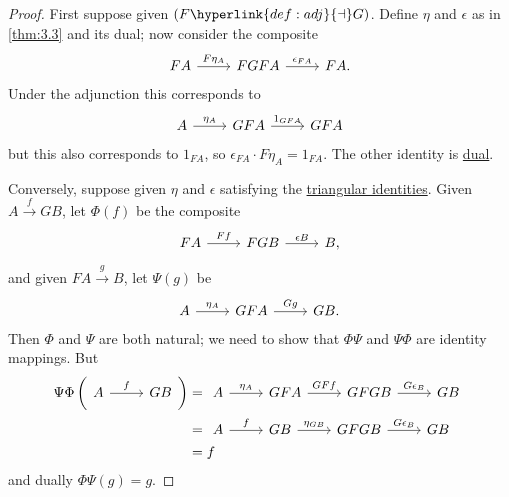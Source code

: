 \documentclass{article}
\begin{document}
\begin{proof}
  First suppose given $(F \hyperlink{def:adj}{\dashv} G)$.
  Define $\eta$ and $\epsilon$ as in \cref{thm:3.3} and its dual; now consider the composite
  \begin{equation*}
    \begin{tikzcd}
      FA \rar{F\eta_A} & FGFA \rar{\epsilon_{FA}} & FA.
    \end{tikzcd}
  \end{equation*}
  Under the adjunction this corresponds to
  \begin{equation*}
    \begin{tikzcd}
      A \rar{\eta_A} & GFA \rar{1_{GFA}} & GFA
    \end{tikzcd}
  \end{equation*}
  but this also corresponds to $1_{FA}$, so $\epsilon_{FA} \cdot F\eta_A = 1_{FA}$.
  The other identity is \hyperlink{def:duality}{dual}.

  Conversely, suppose given $\eta$ and $\epsilon$ satisfying the \hyperlink{def:triId}{triangular identities}.
  Given $A \xrightarrow{f} GB$, let $\Phi(f)$ be the composite
  \begin{equation*}
    \begin{tikzcd}
      FA \rar{Ff} & FGB \rar{\epsilon B} & B,
    \end{tikzcd}
  \end{equation*}
  and given $FA \xrightarrow{g} B$, let $\Psi(g)$ be
  \begin{equation*}
    \begin{tikzcd}
      A \rar{\eta_A} & GFA \rar{Gg} & GB.
    \end{tikzcd}
  \end{equation*}
  Then $\Phi$ and $\Psi$ are both natural; we need to show that $\Phi \Psi$ and $\Psi \Phi$ are identity mappings.
  But
  \begin{align*}
    \Psi \Phi \left(
    \begin{tikzcd}[ampersand replacement=\&]
        A \rar{f} \& GB
      \end{tikzcd}
  \right) &=
      \begin{tikzcd}[ampersand replacement=\&]
        A \rar{\eta_A} \& GFA \rar{GFf} \& GFGB \rar{G\epsilon_B} \& GB
      \end{tikzcd} \\
      &=
      \begin{tikzcd}[ampersand replacement=\&]
        A \rar{f} \& GB \rar{\eta_{GB}} \& GFGB \rar{G\epsilon_B} \& GB
      \end{tikzcd} \\
      &= f
  \end{align*}
  and dually $\Phi \Psi(g) = g$.
\end{proof}
\end{document}
